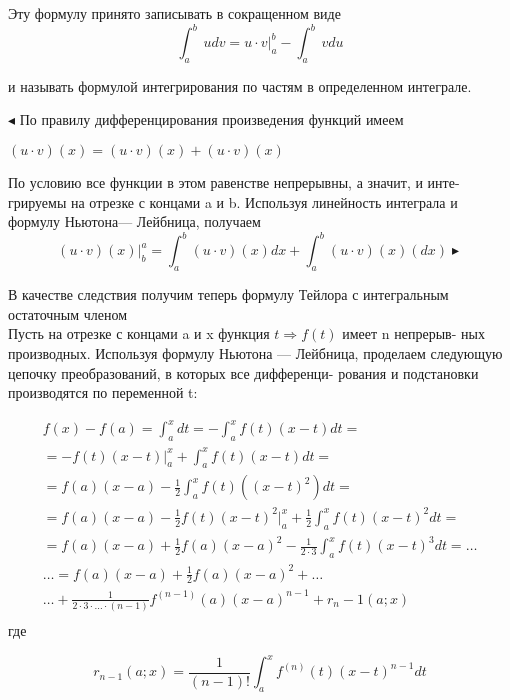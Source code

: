 \documentclass[14pt]{extreport}
\begin{document}
Эту формулу принято записывать в сокращенном виде
\begin{equation}
	\int_{a}^{b}  \,udv = u \cdot v | _a^b - \int_{a}^{b} \, vdu
\end{equation}

и называть формулой интегрирования по частям в определенном интеграле.

$\blacktriangleleft$ По правилу дифференцирования произведения функций имеем
\begin{center}
	$
	(u \cdot v) (x) = (u \cdot v) (x) + (u \cdot v)(x)
	$
\end{center}
По условию все функции в этом равенстве непрерывны, а значит, и инте-
грируемы на отрезке с концами a и b. Используя линейность интеграла и
формулу Ньютона— Лейбница, получаем
\begin{equation}
	(u \cdot v) (x) |^a_b = \int_{a}^{b}(u \cdot v)(x)dx+\int_{a}^{b}(u \cdot v)(x)(dx) \blacktriangleright
\end{equation}

В качестве следствия получим теперь формулу Тейлора с интегральным
остаточным членом
\\

Пусть на отрезке с концами a и x функция $t \Rightarrow  f (t)$ имеет n непрерыв-
ных производных. Используя формулу Ньютона — Лейбница,
проделаем следующую цепочку преобразований, в которых все дифференци-
рования и подстановки производятся по переменной t:

\begin{multline}
	f(x)-f(a)=\int_{a}^{x}dt = - \int_{a}^{x}f(t)(x-t)dt=\\
	= -f(t)(x-t)|^x_a + \int_{a}^{x}f(t)(x-t)dt =\\
	=f(a)(x-a)-\frac{1}{2}\int_{a}^{x}f(t)((x-t)^2)dt=\\
	=f(a)(x-a)-\frac{1}{2}f(t)(x-t)^2|^x_a+\frac{1}{2}\int^x_a f(t)(x-t)^2dt=\\
	=f(a)(x-a)+\frac{1}{2}f(a)(x-a)^2-\frac{1}{2 \cdot 3} \int^x_a f(t) (x-t)^3 dt = \dots \\
	\dots = f(a)(x-a)+\frac{1}{2}f(a)(x-a)^2 + \dots \\
	\dots + \frac{1}{2 \cdot 3 \cdot  \dots \cdot (n-1) } f^(n-1)(a)(x-a)^{n-1}+r_n-1(a;x) \\
\end{multline}
где

\begin{equation}
	r_{n-1}(a;x)=\frac{1}{(n-1)!}\int^x_a f^{(n)}(t)(x-t)^{n-1}dt	
\end{equation}
\end{document}
